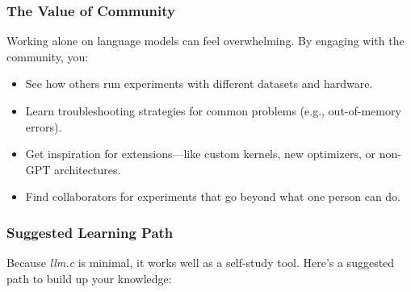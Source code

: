 \documentclass[
  letterpaper,
  DIV=11,
  numbers=noendperiod]{scrreprt}
\providecommand{\tightlist}{%
  \setlength{\itemsep}{0pt}\setlength{\parskip}{0pt}}
\begin{document}
\subsubsection{The Value of Community}\label{the-value-of-community}

Working alone on language models can feel overwhelming. By engaging with
the community, you:

\begin{itemize}
\tightlist
\item
  See how others run experiments with different datasets and hardware.
\item
  Learn troubleshooting strategies for common problems (e.g.,
  out-of-memory errors).
\item
  Get inspiration for extensions---like custom kernels, new optimizers,
  or non-GPT architectures.
\item
  Find collaborators for experiments that go beyond what one person can
  do.
\end{itemize}

\subsubsection{Suggested Learning Path}\label{suggested-learning-path}

Because \emph{llm.c} is minimal, it works well as a self-study tool.
Here's a suggested path to build up your knowledge:
\end{document}
